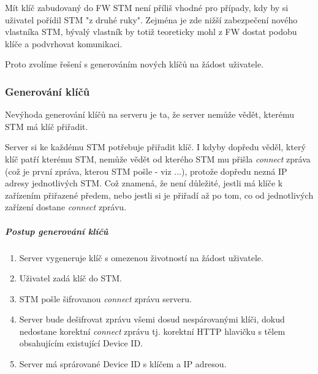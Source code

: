Mít klíč zabudovaný do FW STM není příliš vhodné pro případy, kdy by si uživatel pořídil STM
"z druhé ruky".
Zejména je zde nižší zabezpečení nového vlastníka STM, bývalý vlastník by totiž teoreticky
mohl z FW dostat podobu klíče a podvrhovat komunikaci.

Proto zvolíme řešení s generováním nových klíčů na žádost uživatele.

\subsubsection{Generování klíčů}

Nevýhoda generování klíčů na serveru je ta, že server nemůže vědět, kterému STM má klíč přiřadit.

Server si ke každému STM potřebuje přiřadit klíč.
I kdyby dopředu věděl, který klíč patří kterému STM, nemůže vědět od kterého STM mu přišla
\emph{connect} zpráva (což je první zpráva, kterou STM pošle - viz ...), protože dopředu nezná
IP adresy jednotlivých STM.
Což znamená, že není důležité, jestli má klíče k zařízením přiřazené předem, nebo jestli
si je přiřadí až po tom, co od jednotlivých zařízení dostane \emph{connect} zprávu.

\subparagraph{Postup generování klíčů}
\begin{enumerate}
    \item Server vygeneruje klíč s omezenou životností na žádost uživatele.
    \item Uživatel zadá klíč do STM.
    \item STM pošle šifrovanou \emph{connect} zprávu serveru.
    \item Server bude dešifrovat zprávu všemi dosud nespárovanými klíči, dokud nedostane korektní
        \emph{connect} zprávu tj. korektní HTTP hlavičku s tělem obsahujícím existující Device ID.
    \item Server má sprárované Device ID s klíčem a IP adresou.
\end{enumerate}


